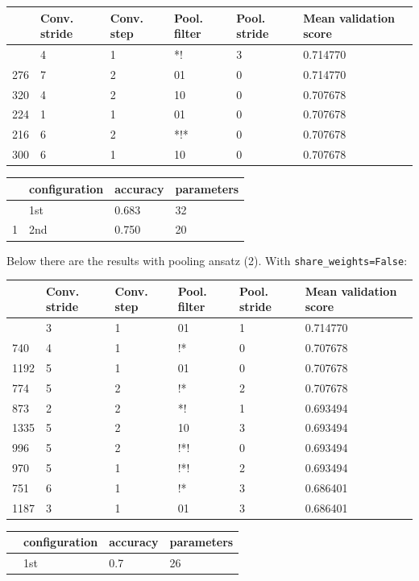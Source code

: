 \documentclass[
  13pt,
  a4paper,
  DIV=11,
  numbers=noendperiod]{scrreprt}
\begin{document}
\begin{longtable}[]{@{}llllll@{}}
\toprule\noalign{}
& Conv. stride & Conv. step & Pool. filter & Pool. stride & Mean
validation score \\
\midrule\noalign{}
\endhead
\bottomrule\noalign{}
\endlastfoot
71 & 4 & 1 & *! & 3 & 0.714770 \\
276 & 7 & 2 & 01 & 0 & 0.714770 \\
320 & 4 & 2 & 10 & 0 & 0.707678 \\
224 & 1 & 1 & 01 & 0 & 0.707678 \\
216 & 6 & 2 & *!* & 0 & 0.707678 \\
300 & 6 & 1 & 10 & 0 & 0.707678 \\
\end{longtable}

\begin{longtable}[]{@{}llll@{}}
\toprule\noalign{}
& configuration & accuracy & parameters \\
\midrule\noalign{}
\endhead
\bottomrule\noalign{}
\endlastfoot
0 & 1st & 0.683 & 32 \\
1 & 2nd & 0.750 & 20 \\
\end{longtable}

Below there are the results with pooling ansatz (2). With
\texttt{share\_weights=False}:

\begin{longtable}[]{@{}llllll@{}}
\toprule\noalign{}
& Conv. stride & Conv. step & Pool. filter & Pool. stride & Mean
validation score \\
\midrule\noalign{}
\endhead
\bottomrule\noalign{}
\endlastfoot
1185 & 3 & 1 & 01 & 1 & 0.714770 \\
740 & 4 & 1 & !* & 0 & 0.707678 \\
1192 & 5 & 1 & 01 & 0 & 0.707678 \\
774 & 5 & 2 & !* & 2 & 0.707678 \\
873 & 2 & 2 & *! & 1 & 0.693494 \\
1335 & 5 & 2 & 10 & 3 & 0.693494 \\
996 & 5 & 2 & !*! & 0 & 0.693494 \\
970 & 5 & 1 & !*! & 2 & 0.693494 \\
751 & 6 & 1 & !* & 3 & 0.686401 \\
1187 & 3 & 1 & 01 & 3 & 0.686401 \\
\end{longtable}

\begin{longtable}[]{@{}llll@{}}
\toprule\noalign{}
& configuration & accuracy & parameters \\
\midrule\noalign{}
\endhead
\bottomrule\noalign{}
\endlastfoot
0 & 1st & 0.7 & 26 \\
\end{longtable}
\end{document}
